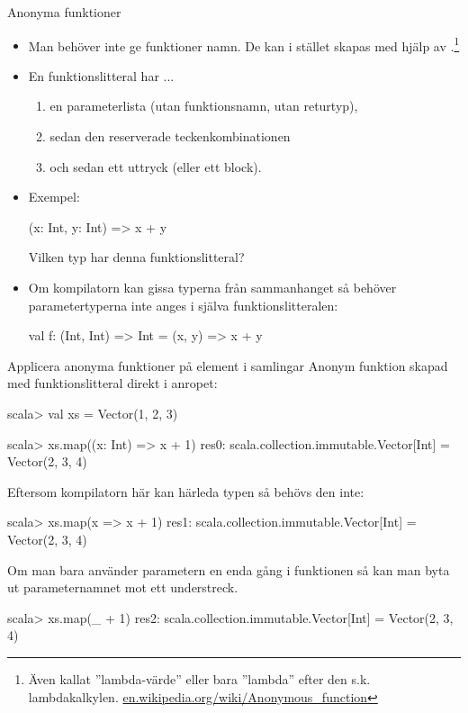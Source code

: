 

\begin{Slide}{Anonyma funktioner}
\ifkompendium \ExplainAnonymousFunction \fi
\begin{itemize}\SlideFontSmall
\item  Man behöver inte ge funktioner namn. De kan i stället skapas med hjälp av .\footnote{Även kallat ''lambda-värde'' eller bara ''lambda'' efter den s.k. lambdakalkylen. \href{https://en.wikipedia.org/wiki/Anonymous_function}{en.wikipedia.org/wiki/Anonymous\_function}}

\item En funktionslitteral har ...
\begin{enumerate}
\item en parameterlista (utan funktionsnamn, utan returtyp),
\item sedan den reserverade teckenkombinationen \code{=>}
\item och sedan ett uttryck (eller ett block).
\end{enumerate}
\pause
\item Exempel:
\begin{Code}[basicstyle=\ttfamily\SlideFontSize{9}{11}]
(x: Int, y: Int) => x + y
\end{Code}
Vilken typ har denna funktionslitteral? \pause \hfill{}
\pause
\item Om kompilatorn kan gissa typerna från sammanhanget så behöver parametertyperna inte anges i själva  funktionslitteralen:
\begin{Code}[basicstyle=\ttfamily\SlideFontSize{9}{11}]
val f: (Int, Int) => Int = (x, y) => x + y
\end{Code}
\end{itemize}
\end{Slide}


\begin{Slide}{Applicera anonyma funktioner på element i samlingar}\SlideFontSmall
Anonym funktion skapad med funktionslitteral direkt i anropet:
\begin{REPL}
scala> val xs = Vector(1, 2, 3)

scala> xs.map((x: Int) => x + 1)
res0: scala.collection.immutable.Vector[Int] = Vector(2, 3, 4)
\end{REPL}
\pause
Eftersom kompilatorn här kan härleda typen  så behövs den inte:
\begin{REPL}
scala> xs.map(x => x + 1)
res1: scala.collection.immutable.Vector[Int] = Vector(2, 3, 4)
\end{REPL}
\pause
Om man bara använder parametern en enda gång i funktionen så kan man byta ut parameternamnet mot ett understreck.
\begin{REPL}
scala> xs.map(_ + 1)
res2: scala.collection.immutable.Vector[Int] = Vector(2, 3, 4)
\end{REPL}
\end{Slide}



